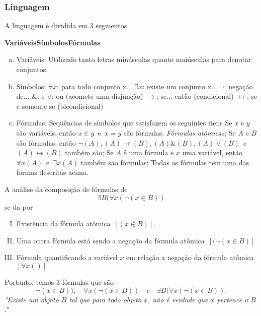       \subsubsection{Linguagem}
         A linguagem é dividida em 3 segmentos
         \begin{center}
            \textbf{Variáveis}\quad \textbf{Símbolos}\quad \textbf{Fórmulas} 
         \end{center}
         \begin{enumerate}[a)]
            \item Variáveis: Utilizado tanto letras minúsculas quanto maiúsculas para denotar conjuntos.
            \item Símbolos:  
               \subitem $\forall x$: para todo conjunto x...
               \subitem $\exists x$: existe um conjunto x...
               \subitem $\neg$: negação de...
               \subitem $\&$: e
               \subitem $\lor$: ou (acomete uma disjunção)
               \subitem $\rightarrow$: se... então (condicional)
               \subitem $\leftrightarrow$: se e somente se (bicondicional)
            \item Fórmulas: Sequências de símbolos que satisfazem os seguintes itens
               \subitem Se $x$ e $y$ são variáveis, então $x \in y$\ e\ $x = y$ são fórmulas. \emph{Fórmulas atômicas};
               \subitem Se $A$ e $B$ são fórmulas, então $\neg(A), (A) \rightarrow (B), (A) \& (B), (A) \lor (B)$\ e\ $(A) \leftrightarrow (B)$ também são;
               \subitem Se $A$ é uma fórmula e $x$ uma variável, então $\forall x(A)$\ e\ $\exists x(A)$ também são fórmulas;
               \subitem Todas as fórmulas tem uma das formas descritas acima.
         \end{enumerate}
         \begin{exmp}
            A análise da composição de fórmulas de
            $$\exists B(\forall x(\neg(x \in B))$$
            se da por
            \begin{enumerate}[I.]
               \item Existência da fórmula atômica\ $[(x \in B)]$.
               \item Uma outra fórmula está sendo a negação da fórmula atômica\ $[(\neg(x \in B)]$
               \item Fórmula quantificando a variável $x$ em relação a negação da fórmula atômica\ $[\forall x()]$
            \end{enumerate}
            Portanto, temos 3 fórmulas que são $$\neg(x \in B)),\quad \forall x(\neg(x \in B)) \quad e\quad \exists B (\forall x(\neg(x \in B)).$$
            \emph{"Existe um objeto $B$ tal que para todo objeto $x$, não é verdade que $x$ pertence a $B$}."
         \end{exmp}
